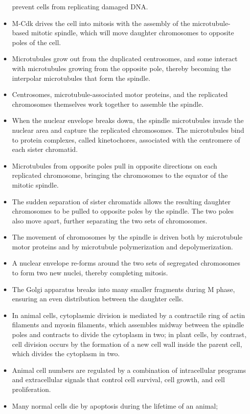 \begin{itemize}
prevent cells from replicating damaged DNA.
\item M-Cdk drives the cell into mitosis with the assembly of the microtubule-based
mitotic spindle, which will move daughter chromosomes
to opposite poles of the cell.
\item Microtubules grow out from the duplicated centrosomes, and some
interact with microtubules growing from the opposite pole, thereby
becoming the interpolar microtubules that form the spindle.
\item Centrosomes, microtubule-associated motor proteins, and the replicated
chromosomes themselves work together to assemble the
spindle.
\item When the nuclear envelope breaks down, the spindle microtubules
invade the nuclear area and capture the replicated chromosomes.
The microtubules bind to protein complexes, called kinetochores,
associated with the centromere of each sister chromatid.
\item Microtubules from opposite poles pull in opposite directions on each
replicated chromosome, bringing the chromosomes to the equator of
the mitotic spindle.
\item The sudden separation of sister chromatids allows the resulting
daughter chromosomes to be pulled to opposite poles by the spindle.
The two poles also move apart, further separating the two sets of
chromosomes.
\item The movement of chromosomes by the spindle is driven both by
microtubule motor proteins and by microtubule polymerization and
depolymerization.
\item A nuclear envelope re-forms around the two sets of segregated chromosomes
to form two new nuclei, thereby completing mitosis.
\item The Golgi apparatus breaks into many smaller fragments during
M phase, ensuring an even distribution between the daughter cells.
\item In animal cells, cytoplasmic division is mediated by a contractile ring
of actin filaments and myosin filaments, which assembles midway
between the spindle poles and contracts to divide the cytoplasm in
two; in plant cells, by contrast, cell division occurs by the formation
of a new cell wall inside the parent cell, which divides the cytoplasm
in two.
\item Animal cell numbers are regulated by a combination of intracellular
programs and extracellular signals that control cell survival, cell
growth, and cell proliferation.
\item Many normal cells die by apoptosis during the lifetime of an animal;

\end{itemize}
